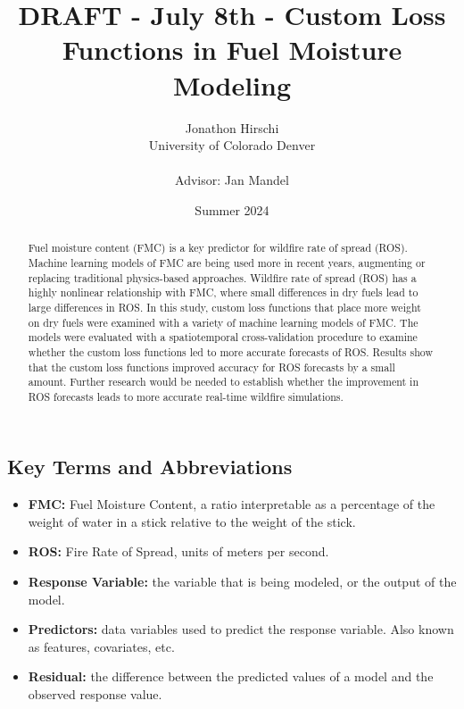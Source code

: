 \documentclass[11pt]{article}%
\begin{document}
\title{DRAFT - July 8th - Custom Loss Functions in Fuel Moisture Modeling}
\author{
    \begin{tabular}[t]{c}
        Jonathon Hirschi \\
        University of Colorado Denver \\
        \\
        Advisor: Jan Mandel
    \end{tabular}
}

\date{Summer 2024}
\maketitle

\begin{abstract}
Fuel moisture content (FMC) is a key predictor for wildfire rate of spread (ROS). Machine learning models of FMC are being used more in recent years, augmenting or replacing traditional physics-based approaches. Wildfire rate of spread (ROS) has a highly nonlinear relationship with FMC, where small differences in dry fuels lead to large differences in ROS. In this study, custom loss functions that place more weight on dry fuels were examined with a variety of machine learning models of FMC. The models were evaluated with a spatiotemporal cross-validation procedure to examine whether the custom loss functions led to more accurate forecasts of ROS. Results show that the custom loss functions improved accuracy for ROS forecasts by a small amount. Further research would be needed to establish whether the improvement in ROS forecasts leads to more accurate real-time wildfire simulations.
\end{abstract}

\subsection*{Key Terms and Abbreviations}
\begin{itemize}
    \item \textbf{FMC:} Fuel Moisture Content, a ratio interpretable as a percentage of the weight of water in a stick relative to the weight of the stick.
    \item \textbf{ROS:} Fire Rate of Spread, units of meters per second.
    \item \textbf{Response Variable:} the variable that is being modeled, or the output of the model.
    \item \textbf{Predictors:} data variables used to predict the response variable. Also known as features, covariates, etc.
    \item \textbf{Residual:} the difference between the predicted values of a model and the observed response value.
\end{itemize}
\end{document}
